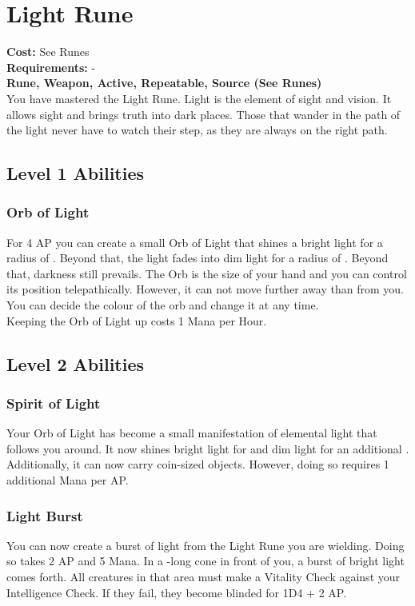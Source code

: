 \twocolumn
\section{Light Rune}
\textbf{Cost:} See Runes\\
\textbf{Requirements:} -\\
\textbf{Rune, Weapon, Active, Repeatable, Source (See Runes)}\\
You have mastered the Light Rune. Light is the element of sight and vision. It allows sight and brings truth into dark places. Those that wander in the path of the light never have to watch their step, as they are always on the right path.
\subsection{Level 1 Abilities}

\subsubsection{Orb of Light}
For 4 AP you can create a small Orb of Light that shines a bright light for a radius of . Beyond that, the light fades into dim light for a radius of . Beyond that, darkness still prevails. The Orb is the size of your hand and you can control its position telepathically. However, it can not move further away than  from you. You can decide the colour of the orb and change it at any time. \\
Keeping the Orb of Light up costs 1 Mana per Hour.


\subsection{Level 2 Abilities}

\subsubsection{Spirit of Light}
Your Orb of Light has become a small manifestation of elemental light that follows you around. It now shines bright light for  and dim light for an additional .\\
Additionally, it can now carry coin-sized objects. However, doing so requires 1 additional Mana per AP.

\subsubsection{Light Burst}
You can now create a burst of light from the Light Rune you are wielding. Doing so takes 2 AP and 5 Mana. In a -long cone in front of you, a burst of bright light comes forth. All creatures in that area must make a Vitality Check against your Intelligence Check. If they fail, they become blinded for 1D4 + 2 AP.

